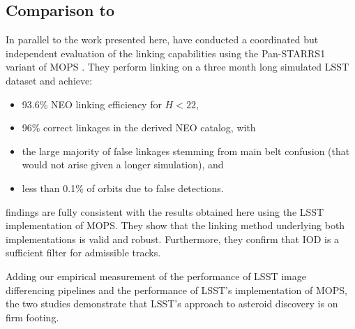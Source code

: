 \subsection{Comparison to \cite{VeresChesley2017mops}\label{sec:mopsVeresChesleyComparison}}

In parallel to the work presented here, \cite{VeresChesley2017mops} have conducted a coordinated but independent evaluation of the linking capabilities using the Pan-STARRS1 variant of MOPS \citep{denneau13}. They perform linking on a three month long simulated LSST dataset and achieve:

\begin{itemize}
	\item 93.6\% NEO linking efficiency for $H < 22$,
	\item 96\% correct linkages in the derived NEO catalog, with
	\item the large majority of false linkages stemming from main belt confusion (that would not arise given a longer simulation), and
	\item less than 0.1\% of orbits due to false detections.
\end{itemize}

\cite{VeresChesley2017mops} findings are fully consistent with the results obtained here using the LSST implementation of MOPS. They show that the linking method underlying both implementations is valid and robust. Furthermore, they confirm that IOD is a sufficient filter for admissible tracks.

Adding our empirical measurement of the performance of LSST image differencing pipelines and the performance of LSST's implementation of MOPS, the two studies demonstrate that LSST's approach to asteroid discovery is on firm footing.